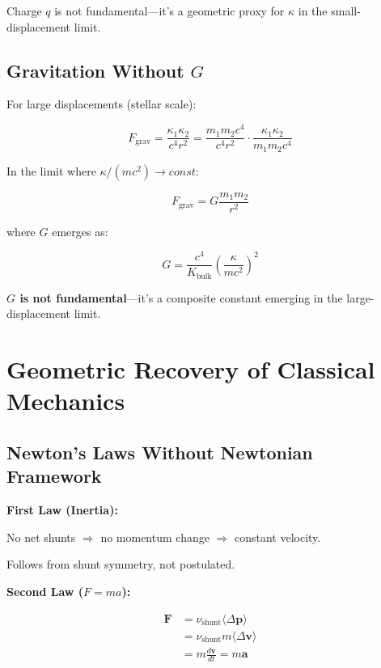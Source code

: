 Charge $q$ is not fundamental—it's a geometric proxy for $\kappa$ in the small-displacement limit.

\subsection{Gravitation Without $G$}

For large displacements (stellar scale):

\begin{equation}
F_{\text{grav}} = \frac{\kappa_1 \kappa_2}{c^4 r^2} = \frac{m_1 m_2 c^4}{c^4 r^2} \cdot \frac{\kappa_1 \kappa_2}{m_1 m_2 c^4}
\end{equation}

In the limit where $\kappa/(mc^2) \to const$:

\begin{equation}
F_{\text{grav}} = G \frac{m_1 m_2}{r^2}
\end{equation}

where $G$ emerges as:

\begin{equation}
G = \frac{c^4}{K_{\text{bulk}}} \left(\frac{\kappa}{mc^2}\right)^2
\end{equation}

\textbf{$G$ is not fundamental}—it's a composite constant emerging in the large-displacement limit.

\section{Geometric Recovery of Classical Mechanics}

\subsection{Newton's Laws Without Newtonian Framework}

\textbf{First Law (Inertia):}

No net shunts $\Rightarrow$ no momentum change $\Rightarrow$ constant velocity.

Follows from shunt symmetry, not postulated.

\textbf{Second Law ($F = ma$):}

\begin{align}
\mathbf{F} &= \nu_{\text{shunt}} \langle \Delta \mathbf{p} \rangle \\
&= \nu_{\text{shunt}} m \langle \Delta \mathbf{v} \rangle \\
&= m \frac{d\mathbf{v}}{dt} = m \mathbf{a}
\end{align}

